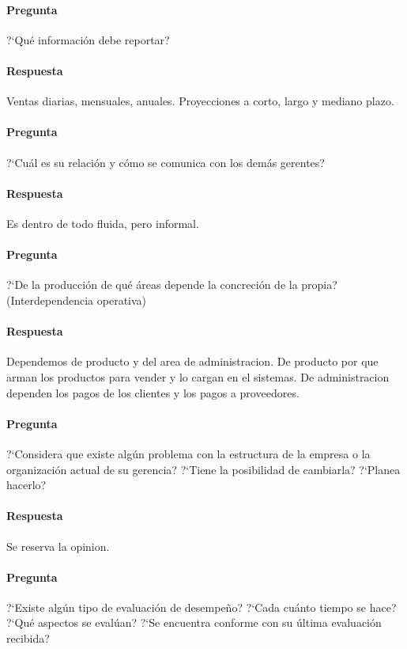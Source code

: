 \documentclass[12pt,a4paper,spanish]{article}
\begin{document}
	\paragraph{Pregunta}
	 ?`Qu\'e informaci\'on debe reportar?
	\paragraph{Respuesta}
Ventas diarias, mensuales, anuales. Proyecciones a corto, largo y mediano plazo.

	\paragraph{Pregunta}
	 ?`Cu\'al es su relaci\'on y c\'omo se comunica con los dem\'as gerentes?
	\paragraph{Respuesta}
Es dentro de todo fluida, pero informal.
	\paragraph{Pregunta}
	 ?`De la producci\'on de qu\'e \'areas depende la concreci\'on de la propia? (Interdependencia operativa)
	\paragraph{Respuesta}
Dependemos de producto y del area de administracion.
De producto por que arman los productos para vender y lo cargan en el sistemas.
De administracion dependen los pagos de los clientes y los pagos a proveedores.

	\paragraph{Pregunta}
	 ?`Considera que existe alg\'un problema con la estructura de la empresa o la organizaci\'on actual de su gerencia?  ?`Tiene la posibilidad de cambiarla?  ?`Planea hacerlo?
	\paragraph{Respuesta}
Se reserva la opinion.
	\paragraph{Pregunta}
	 ?`Existe alg\'un tipo de evaluaci\'on de desempe\~{n}o?  ?`Cada cu\'anto tiempo se hace?  ?`Qu\'e aspectos se eval\'uan?  ?`Se encuentra conforme con su \'ultima evaluaci\'on recibida?
\end{document}
